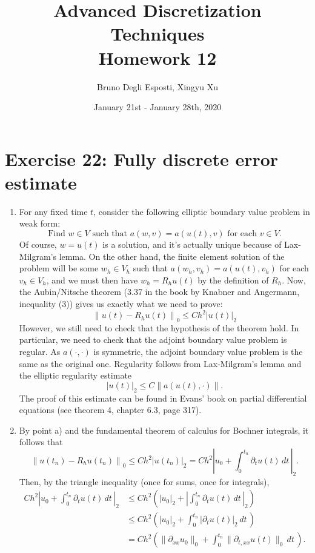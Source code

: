 \documentclass[a4paper]{article}
\title{\huge{Advanced Discretization Techniques \\ Homework 12}}
\author{\Large{Bruno Degli Esposti, Xingyu Xu}}
\date{January 21st - January 28th, 2020}
\newcommand{\dt}{\, dt \,}
\newcommand{\seminorm}[1]{\left\lvert #1 \right\rvert}
\newcommand{\norm}[1]{\left\lVert #1 \right\rVert}
\begin{document}
\maketitle

\section*{Exercise 22: Fully discrete error estimate}
\begin{enumerate}[label=\textbf{\alph*)},leftmargin=*]
\item For any fixed time $t$, consider the following elliptic boundary
	value problem in weak form:
	\[
	\text{Find } w \in V \text{ such that } a(w,v) = a(u(t),v) \text{ for each } v \in V.
	\]
	Of course, $w = u(t)$ is a solution, and it's actually unique
	because of Lax-Milgram's lemma. On the other hand, the finite
	element solution of the problem will be some $w_h \in V_h$
	such that $a(w_h,v_h) = a(u(t),v_h)$ for each $v_h \in V_h$,
	and we must then have $w_h = R_h u(t)$ by the definition of $R_h$.
	Now, the Aubin/Nitsche theorem (3.37 in the book by Knabner and Angermann,
	inequality (3)) gives us exactly what we need to prove:
	\[
	\norm{u(t) - R_h u(t)}_0 \leq C h^2 \seminorm{u(t)}_2
	\]
	However, we still need to check that the hypothesis of the theorem hold.
	In particular, we need to check that the adjoint boundary value problem
	is regular. As $a(\cdot,\cdot)$ is symmetric, the adjoint boundary value problem
	is the same as the original one. Regularity follows from
	Lax-Milgram's lemma and the elliptic regularity estimate
	\[
	\seminorm{u(t)}_2 \leq C \norm{a(u(t),\cdot)}.
	\]
	The proof of this estimate can be found in Evans' book on partial
	differential equations (see theorem 4, chapter 6.3, page 317).
\item By point a) and the fundamental theorem of calculus for Bochner integrals,
	it follows that
	\[
	\norm{u(t_n) - R_h u(t_n)}_0
	\leq C h^2 \seminorm{u(t_n)}_2
	= C h^2 \seminorm{u_0 + \int_0^{t_n} \partial_t u(t) \dt}_2.
	\]
	Then, by the triangle inequality (once for sums, once for integrals),
	\begin{align*}
	C h^2 \seminorm{u_0 + \int_0^{t_n} \partial_t u(t) \dt}_2
&	\leq Ch^2\left(|u_0|_2+\left|\int^{t_n}_0\partial_tu(t)\dt\right|_2\right) \\
&	\leq Ch^2 \left( \seminorm{u_0}_2
		+ \int_0^{t_n} \seminorm{\partial_t u(t)}_2 \dt \right) \\
&	= Ch^2\left(\|\partial_{xx}u_0\|_0+\int^{t_n}_0\|\partial_{t,xx}u(t)\|_0\dt\right).
	\end{align*}

\end{enumerate}
\end{document}

